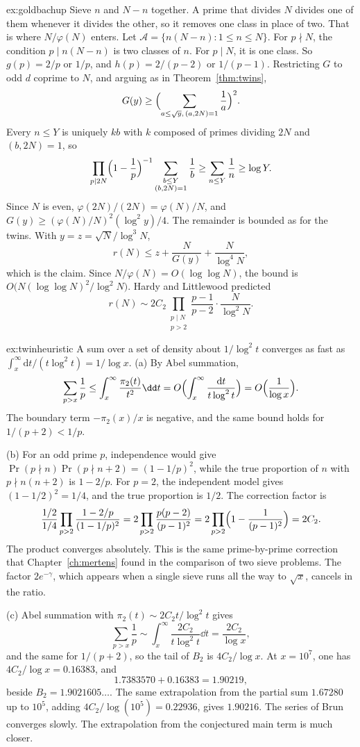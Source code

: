 \begin{solution}{ex:goldbachup}
\idea Sieve $n$ and $N-n$ together. A prime that divides $N$ divides one of them whenever it divides the other, so it removes one class in place of two. That is where $N/\varphi(N)$ enters.
\writeup Let $\mathcal A=\{n(N-n):1\le n\le N\}$. For $p\nmid N$, the condition $p\mid n(N-n)$ is two classes of $n$. For $p\mid N$, it is one class. So $g(p)=2/p$ or $1/p$, and $h(p)=2/(p-2)$ or $1/(p-1)$. Restricting $G$ to odd $d$ coprime to $N$, and arguing as in Theorem~\ref{thm:twins},
\[
G(y)\ge\Bigl(\sum_{a\le\sqrt y,\,(a,2N)=1}\frac1a\Bigr)^2.
\]
Every $n\le Y$ is uniquely $kb$ with $k$ composed of primes dividing $2N$ and $(b,2N)=1$, so
\[
\prod_{p\mid2N}\Bigl(1-\frac1p\Bigr)^{-1}\sum_{\substack{b\le Y\\(b,2N)=1}}\frac1b\ge\sum_{n\le Y}\frac1n\ge\log Y.
\]
Since $N$ is even, $\varphi(2N)/(2N)=\varphi(N)/N$, and $G(y)\ge(\varphi(N)/N)^2(\log^2y)/4$. The remainder is bounded as for the twins. With $y=z=\sqrt N/\log^3N$,
\[
r(N)\le z+\frac N{G(y)}+\frac N{\log^4N},
\]
which is the claim. Since $N/\varphi(N)=O(\log\log N)$, the bound is $O\bigl(N(\log\log N)^2/\log^2N\bigr)$. Hardy and Littlewood predicted
\[
r(N)\sim2C_2\prod_{\substack{p\mid N\\p>2}}\frac{p-1}{p-2}\cdot\frac N{\log^2N}.
\]
\end{solution}

\begin{solution}{ex:twinheuristic}
\idea A sum over a set of density about $1/\log^2t$ converges as fast as $\int_x^\infty\mathrm dt/(t\log^2t)=1/\log x$.
\writeup (a) By Abel summation,
\[
\sum_{p>x}\frac1p\le\int_x^\infty\frac{\pi_2(t)}{t^2}\dd t=O\Bigl(\int_x^\infty\frac{\mathrm dt}{t\log^2t}\Bigr)=O\Bigl(\frac1{\log x}\Bigr).
\]
The boundary term $-\pi_2(x)/x$ is negative, and the same bound holds for $1/(p+2)<1/p$.

(b) For an odd prime $p$, independence would give $\Pr(p\nmid n)\Pr(p\nmid n+2)=(1-1/p)^2$, while the true proportion of $n$ with $p\nmid n(n+2)$ is $1-2/p$. For $p=2$, the independent model gives $(1-1/2)^2=1/4$, and the true proportion is $1/2$. The correction factor is
\[
\frac{1/2}{1/4}\prod_{p>2}\frac{1-2/p}{(1-1/p)^2}=2\prod_{p>2}\frac{p(p-2)}{(p-1)^2}=2\prod_{p>2}\Bigl(1-\frac1{(p-1)^2}\Bigr)=2C_2.
\]
The product converges absolutely. This is the same prime-by-prime correction that Chapter~\ref{ch:mertens} found in the comparison of two sieve problems. The factor $2e^{-\gamma}$, which appears when a single sieve runs all the way to $\sqrt x$, cancels in the ratio.

(c) Abel summation with $\pi_2(t)\sim2C_2 t/\log^2t$ gives
\[
\sum_{p>x}\frac1p\sim\int_x^\infty\frac{2C_2}{t\log^2t}\dd t=\frac{2C_2}{\log x},
\]
and the same for $1/(p+2)$, so the tail of $B_2$ is $4C_2/\log x$. At $x=10^7$, one has $4C_2/\log x=0.16383$, and
\[
1.7383570+0.16383=1.90219,
\]
beside $B_2=1.9021605\ldots$. The same extrapolation from the partial sum $1.67280$ up to $10^5$, adding $4C_2/\log(10^5)=0.22936$, gives $1.90216$. The series of Brun converges slowly. The extrapolation from the conjectured main term is much closer.
\end{solution}

